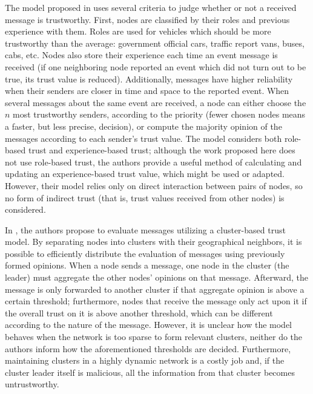 The model proposed in \citep{minhas2010towards} uses several criteria to judge whether or not a received message is trustworthy.
First, nodes are classified by their roles and previous experience with them.
Roles are used for vehicles which should be more trustworthy than the average: government official cars, traffic report vans, buses, cabs, etc.
Nodes also store their experience each time an event message is received (if one neighboring node reported an event which did not turn out to be true, its trust value is reduced).
Additionally, messages have higher reliability when their senders are closer in time and space to the reported event.
When several messages about the same event are received, a node can either choose the $n$ most trustworthy senders, according to the priority (fewer chosen nodes means a faster, but less precise, decision), or compute the majority opinion of the messages according to each sender's trust value.
The model considers both role-based trust and experience-based trust; although the work proposed here does not use role-based trust, the authors provide a useful method of calculating and updating an experience-based trust value, which might be used or adapted.
However, their model relies only on direct interaction between pairs of nodes, so no form of indirect trust (that is, trust values received from other nodes) is considered.


In \citep{chen2010trust}, the authors propose to evaluate messages utilizing a cluster-based trust model.
By separating nodes into clusters with their geographical neighbors, it is possible to efficiently distribute the evaluation of messages using previously formed opinions.
When a node sends a message, one node in the cluster (the leader) must aggregate the other nodes' opinions on that message.
Afterward, the message is only forwarded to another cluster if that aggregate opinion is above a certain threshold; furthermore, nodes that receive the message only act upon it if the overall trust on it is above another threshold, which can be different according to the nature of the message.
However, it is unclear how the model behaves when the network is too sparse to form relevant clusters, neither do the authors inform how the aforementioned thresholds are decided.
Furthermore, maintaining clusters in a highly dynamic network is a costly job and, if the cluster leader itself is malicious, all the information from that cluster becomes untrustworthy.

